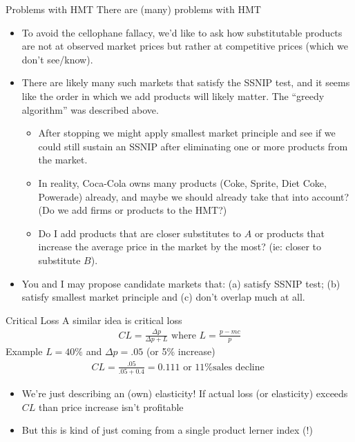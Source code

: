 \documentclass[aspectratio=169,10pt]{beamer}
\begin{document}
\begin{frame}{Problems with HMT}
There are (many) problems with HMT
\begin{itemize}
\item To avoid the cellophane fallacy, we'd like to ask how substitutable products are not at \alert{observed market prices} but rather at \alert{competitive prices} (which we don't see/know).
\item There are likely many such markets that satisfy the SSNIP test, and it seems like the order in which we add products will likely matter. The ``greedy algorithm'' was described above.
\begin{itemize}
    \item After stopping we might apply \alert{smallest market principle} and see if we could still sustain an SSNIP after eliminating one or more products from the market.
    \item In reality, Coca-Cola owns many products (Coke, Sprite, Diet Coke, Powerade) already, and maybe we should already take that into account? (Do we add firms or products to the HMT?)
    \item Do I add products that are closer substitutes to $A$ or products that increase the average price in the market by the most? (ie: closer to substitute $B$).
\end{itemize}
\item You and I may propose candidate markets that: (a) satisfy SSNIP test; (b) satisfy smallest market principle and (c) don't overlap much at all.
\end{itemize}
\end{frame}

\begin{frame}{Critical Loss}
A similar idea is \alert{critical loss}
\begin{align*}
    CL = \frac{\Delta p}{\Delta p +L} \text{ where  } L=\frac{p-mc}{p}
\end{align*}
Example $L = 40\%$ and $\Delta p=.05$ (or 5\% increase)
\begin{align*}
    CL = \frac{.05 }{.05 + 0.4} = 0.111 \text { or 11\% sales decline }
\end{align*}
\begin{itemize}
    \item We're just describing an (own) elasticity! If actual loss (or elasticity) exceeds $CL$ than price increase isn't profitable    
    \item But this is kind of just coming from a single product lerner index (!)
\end{itemize}
\end{frame}
\end{document}
